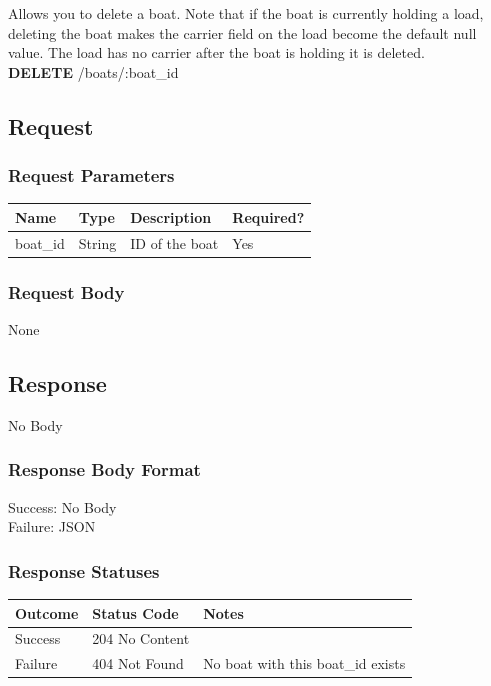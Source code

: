 \documentclass[letterpaper,11pt,titlepage,draftclsnofoot,onecolumn,compsoc,utf8,latin1]{IEEEtran}
\begin{document}
\begin{singlespace}
Allows you to delete a boat. Note that if the boat is currently holding a load, deleting the boat makes the carrier field on the load become the default null value. The load has no carrier after the boat is holding it is deleted.\\

\noindent \textbf{DELETE} /boats/:boat\_id

\subsection{Request}

\subsubsection{Request Parameters}

\begin{center}
    \begin{tabular}{ | p{} | p{} | p{} | p{} |}
    \hline
        \textbf{Name} & \textbf{Type} & \textbf{Description} &\textbf{Required?}  \\ \hline
        boat\_id & String & ID of the boat & Yes \\
    \hline
    \end{tabular}
\end{center}

\subsubsection{Request Body}

None

\subsection{Response}

No Body

\subsubsection{Response Body Format}
Success: No Body\\
\noindent Failure: JSON

\subsubsection{Response Statuses}

\begin{center}
\begin{tabular}{ |p{}|p{}|p{}| } 
 \hline
 \textbf{Outcome} & \textbf{Status Code} & \textbf{Notes}  \\  \hline
 Success & 204 No Content &  \\ \hline
 Failure & 404 Not Found & No boat with this boat\_id exists \\
 \hline
\end{tabular}
\end{center}


\end{singlespace}
\end{document}
